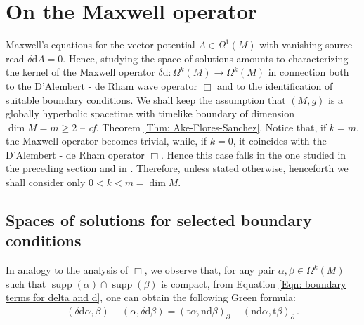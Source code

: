 \section{On the Maxwell operator}\label{Sec: on the Maxwell operator}

Maxwell's equations for the vector potential $A\in\Omega^1(M)$ with vanishing source read $\delta\mathrm{d}A=0$. Hence, studying the space of solutions amounts to characterizing the kernel of the Maxwell operator $\delta\mathrm{d}:\Omega^k(M)\to\Omega^k(M)$ in connection both to the D'Alembert - de Rham wave operator $\Box$ and to the identification of suitable boundary conditions.
We shall keep the assumption that $(M,g)$ is a globally hyperbolic spacetime with timelike boundary of dimension $\dim M = m\geq 2$ -- \textit{cf.} Theorem \ref{Thm: Ake-Flores-Sanchez}.
Notice that, if $k=m$, the Maxwell operator becomes trivial, while, if $k=0$, it coincides with the D'Alembert - de Rham operator $\Box$. 
Hence this case falls in the one studied in the preceding section and in \cite{Dappiaggi-Drago-Ferreira-19}. Therefore, unless stated otherwise, henceforth we shall consider only $0<k<m=\dim M$.

\subsection{Spaces of solutions for selected boundary conditions}\label{Sub: solutions maxwell}

In analogy to the analysis of $\Box$, we observe that, for any pair $\alpha,\beta\in\Omega^k(M)$ such that $\operatorname{supp}(\alpha)\cap\operatorname{supp}(\beta)$ is compact, from Equation \eqref{Eqn: boundary terms for delta and d}, one can obtain the following Green formula:
\begin{align}\label{Eqn: boundary terms for delta d operator}
(\delta\mathrm{d}\alpha,\beta)-(\alpha,\delta\mathrm{d}\beta)=
(\mathrm{t}\alpha,\mathrm{n}\mathrm{d}\beta)_\partial
-(\mathrm{n}\mathrm{d}\alpha,\mathrm{t}\beta)_\partial\,.
\end{align}

